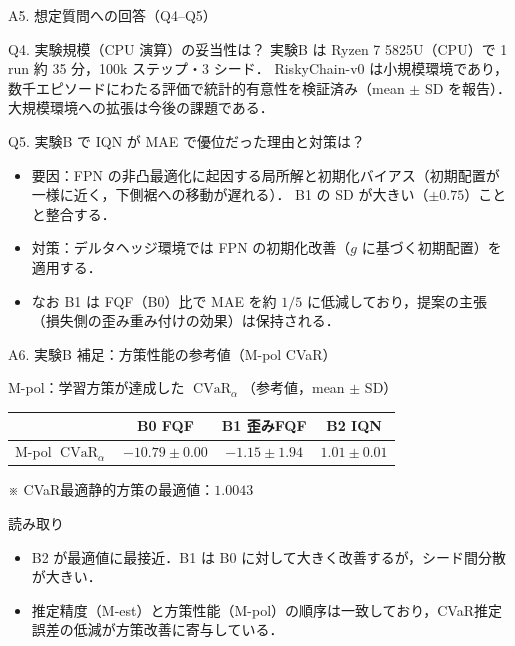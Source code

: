 \documentclass[aspectratio=169, 10pt]{beamer}
\DeclareMathOperator{\CVaR}{CVaR}
\begin{document}
\begin{frame}{A5. 想定質問への回答（Q4--Q5）}
  \begin{alertblock}{Q4. 実験規模（CPU 演算）の妥当性は？}
    実験B は Ryzen 7 5825U（CPU）で 1 run 約 35 分，100k ステップ・3 シード．
    RiskyChain-v0 は小規模環境であり，数千エピソードにわたる評価で\alert{統計的有意性を検証済み}（mean $\pm$ SD を報告）．
    大規模環境への拡張は今後の課題である．
  \end{alertblock}
  \begin{alertblock}{Q5. 実験B で IQN が MAE で優位だった理由と対策は？}
    \begin{itemize}
      \item 要因：FPN の\alert{非凸最適化}に起因する局所解と\alert{初期化バイアス}（初期配置が一様に近く，下側裾への移動が遅れる）．
            B1 の SD が大きい（$\pm0.75$）ことと整合する．
      \item 対策：デルタヘッジ環境では FPN の\alert{初期化改善}（$g$ に基づく初期配置）を適用する．
      \item なお B1 は FQF（B0）比で MAE を約 $1/5$ に低減しており，提案の主張（損失側の歪み重み付けの効果）は保持される．
    \end{itemize}
  \end{alertblock}
\end{frame}

\begin{frame}{A6. 実験B 補足：方策性能の参考値（M-pol CVaR）}
  \begin{block}{M-pol：学習方策が達成した $\CVaR_\alpha$（参考値，mean $\pm$ SD）}
    \centering
    \small
    \begin{tabular}{@{}lccc@{}}
      \toprule
      & B0 FQF & B1 歪みFQF & B2 IQN \\
      \midrule
      M-pol $\CVaR_\alpha$ & $-10.79\pm0.00$ & $-1.15\pm1.94$ & $\mathbf{1.01\pm0.01}$ \\
      \bottomrule
    \end{tabular}\par\vspace{2pt}
    {\footnotesize ※ CVaR最適静的方策の最適値：$1.0043$}
  \end{block}
  \begin{exampleblock}{読み取り}
    \begin{itemize}
      \item B2 が最適値に最接近．B1 は B0 に対して大きく改善するが，シード間分散が大きい．
      \item 推定精度（M-est）と方策性能（M-pol）の順序は一致しており，\alert{CVaR推定誤差の低減が方策改善に寄与}している．
    \end{itemize}
  \end{exampleblock}
\end{frame}
\end{document}
